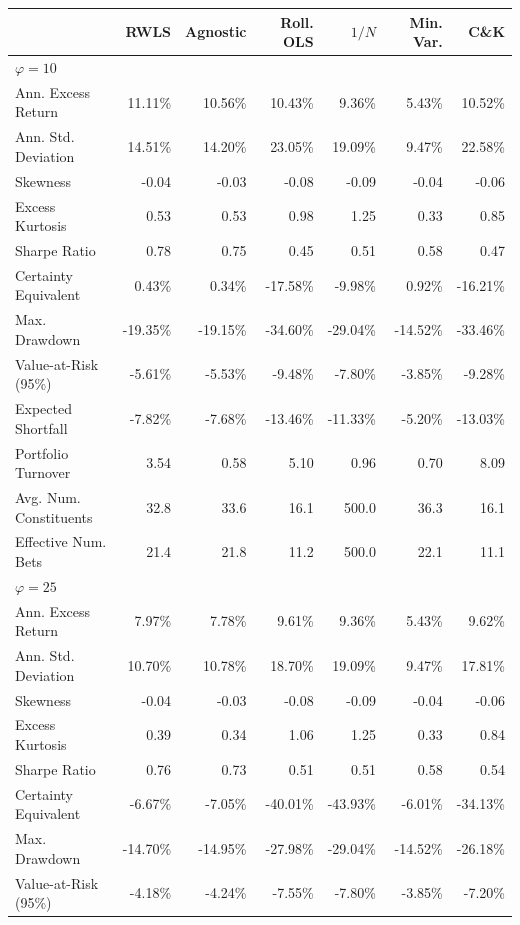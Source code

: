 \begin{tabular*}{\textwidth}{l@{\extracolsep{\fill}}rrrrrr}
\toprule
 & RWLS & Agnostic & Roll. OLS & $1/N$ & Min. Var. & C\&K \\
\midrule
\multicolumn{7}{l}{\textit{$\varphi = 10$}} \\
\midrule
Ann. Excess Return & 11.11\% & 10.56\% & 10.43\% & 9.36\% & 5.43\% & 10.52\% \\
Ann. Std. Deviation & 14.51\% & 14.20\% & 23.05\% & 19.09\% & 9.47\% & 22.58\% \\
Skewness & -0.04 & -0.03 & -0.08 & -0.09 & -0.04 & -0.06 \\
Excess Kurtosis & 0.53 & 0.53 & 0.98 & 1.25 & 0.33 & 0.85 \\
Sharpe Ratio & 0.78 & 0.75 & 0.45 & 0.51 & 0.58 & 0.47 \\
Certainty Equivalent & 0.43\% & 0.34\% & -17.58\% & -9.98\% & 0.92\% & -16.21\% \\
Max. Drawdown & -19.35\% & -19.15\% & -34.60\% & -29.04\% & -14.52\% & -33.46\% \\
Value-at-Risk (95\%) & -5.61\% & -5.53\% & -9.48\% & -7.80\% & -3.85\% & -9.28\% \\
Expected Shortfall & -7.82\% & -7.68\% & -13.46\% & -11.33\% & -5.20\% & -13.03\% \\
Portfolio Turnover & 3.54 & 0.58 & 5.10 & 0.96 & 0.70 & 8.09 \\
Avg. Num. Constituents & 32.8 & 33.6 & 16.1 & 500.0 & 36.3 & 16.1 \\
Effective Num. Bets & 21.4 & 21.8 & 11.2 & 500.0 & 22.1 & 11.1 \\
\midrule
\multicolumn{7}{l}{\textit{$\varphi = 25$}} \\
\midrule
Ann. Excess Return & 7.97\% & 7.78\% & 9.61\% & 9.36\% & 5.43\% & 9.62\% \\
Ann. Std. Deviation & 10.70\% & 10.78\% & 18.70\% & 19.09\% & 9.47\% & 17.81\% \\
Skewness & -0.04 & -0.03 & -0.08 & -0.09 & -0.04 & -0.06 \\
Excess Kurtosis & 0.39 & 0.34 & 1.06 & 1.25 & 0.33 & 0.84 \\
Sharpe Ratio & 0.76 & 0.73 & 0.51 & 0.51 & 0.58 & 0.54 \\
Certainty Equivalent & -6.67\% & -7.05\% & -40.01\% & -43.93\% & -6.01\% & -34.13\% \\
Max. Drawdown & -14.70\% & -14.95\% & -27.98\% & -29.04\% & -14.52\% & -26.18\% \\
Value-at-Risk (95\%) & -4.18\% & -4.24\% & -7.55\% & -7.80\% & -3.85\% & -7.20\% \\

\end{tabular*}

